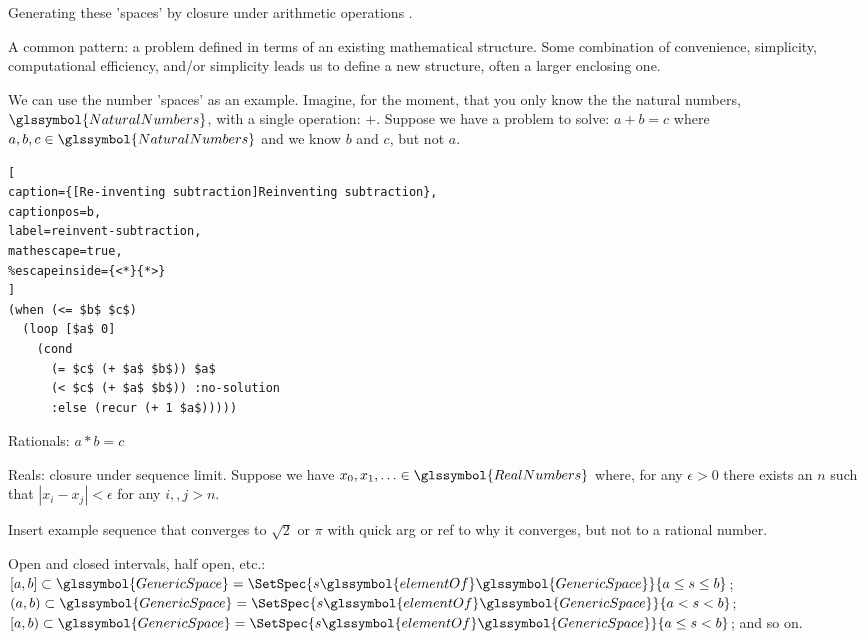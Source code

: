 Generating these 'spaces' by closure under arithmetic operations
\cite{pickert-gorke-real-numbers-1974}.

A common pattern: a problem defined in terms of an existing mathematical
structure. Some combination of convenience, simplicity, computational
efficiency, and/or simplicity leads us to define a new structure, 
often a larger enclosing one.

We can use the number 'spaces' as an example.
Imagine, for the moment, that you only know the 
the natural numbers, $\glssymbol{NaturalNumbers}$, with a single operation: $+$.
Suppose we have a problem to solve:
\begin{math}
a + b = c
\end{math}
where $a,b,c\in \glssymbol{NaturalNumbers}$ and we know $b$ and $c$,
but not $a$.

\begin{lstlisting}[
caption={[Re-inventing subtraction]Reinventing subtraction},
captionpos=b,
label=reinvent-subtraction,
mathescape=true,
%escapeinside={<*}{*>}
] 
(when (<= $b$ $c$)
  (loop [$a$ 0]
    (cond 
      (= $c$ (+ $a$ $b$)) $a$
      (< $c$ (+ $a$ $b$)) :no-solution
      :else (recur (+ 1 $a$)))))
\end{lstlisting}

Rationals: 
\begin{math}
a * b = c
\end{math}

Reals: closure under sequence limit.
Suppose we have $x_0, x_1, \ldots \in \glssymbol{RealNumbers}$
where, for any $\epsilon>0$ there exists an $n$ such that
$|x_i - x_j| < \epsilon$ for any $i,, j > n$.

Insert example sequence that converges to $\sqrt{2}$ or $\pi$
with quick arg or ref to why it converges, but not to a rational
number.


Open and closed intervals, half open, etc.:
$[a,b] \subset \glssymbol{GenericSpace} = 
\SetSpec{s \glssymbol{elementOf} \glssymbol{GenericSpace}}
{a \leq s \leq b}$;
$(a,b) \subset \glssymbol{GenericSpace} = 
\SetSpec{s \glssymbol{elementOf} \glssymbol{GenericSpace}}
{a < s < b}$;
$[a,b) \subset \glssymbol{GenericSpace} = 
\SetSpec{s \glssymbol{elementOf} \glssymbol{GenericSpace}}
{a \leq s < b}$;
and so on.

